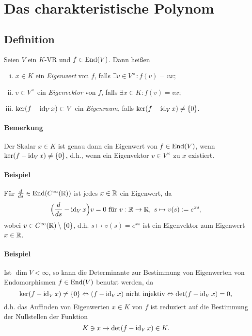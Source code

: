 \section{Das charakteristische Polynom}
\subsection{Definition}
\begin{Definition}
	Seien $ V $ ein $ K $-VR und $ f\in\operatorname{End}(V) $. Dann heißen
		\begin{enumerate}[(i)]
			\item $ x\in K $ ein \emph{Eigenwert} von $ f $, falls  $ \exists v\in V^\times: f(v)=vx; $
			\item $ v\in V^\times $ ein \emph{Eigenvektor} von $ f $, falls  $\exists x\in K:f(v)=vx; $
			\item $ \ker(f-\operatorname{id}_Vx) \subset V $ ein \emph{Eigenraum}, falls $\ker(f-\operatorname{id}_Vx) \neq \{0\}.$
		\end{enumerate}
	\end{Definition}
\paragraph{Bemerkung}
	Der Skalar $ x\in K $ ist genau dann ein Eigenwert von $ f\in \operatorname{End}(V) $, wenn $ \ker(f-\operatorname{id}_Vx)\neq \{0\} $, d.h., wenn ein Eigenvektor $ v\in V^\times $ zu $ x $ existiert.
\paragraph{Beispiel}
	Für $ \frac{d}{ds} \in \operatorname{End}(C^\infty(\mathbb{R}))$ ist jedes $ x\in \mathbb{R} $ ein Eigenwert, da
		\[ \Big(\frac{d}{ds}-\operatorname{id}_Vx\Big)v = 0 \text{ für } v:\mathbb{R}\to\mathbb{R},\ s\mapsto v(s):= e^{xs}, \]
	wobei $ v\in C^\infty(\mathbb{R})\setminus \{0\} $, d.h. $ s\mapsto v(s)=e^{xs} $ ist ein Eigenvektor zum Eigenwert $ x\in\mathbb{R} $.
\paragraph{Beispiel}
	Ist $ \dim V < \infty $, so kann die Determinante zur Bestimmung von Eigenwerten von Endomorphismen $ f\in\operatorname{End}(V) $ benutzt werden, da
		\[ \ker(f-\operatorname{id}_Vx)\neq \{0\} \Leftrightarrow (f-\operatorname{id}_Vx) \text{ nicht injektiv}\Leftrightarrow \det(f-\operatorname{id}_Vx) = 0, \]
	d.h. das Auffinden von Eigenwerten $ x\in K $ von $ f $ ist reduziert auf die Bestimmung der Nullstellen der Funktion
		\[ K\ni x\mapsto \det(f-\operatorname{id}_Vx)\in K. \]
		

